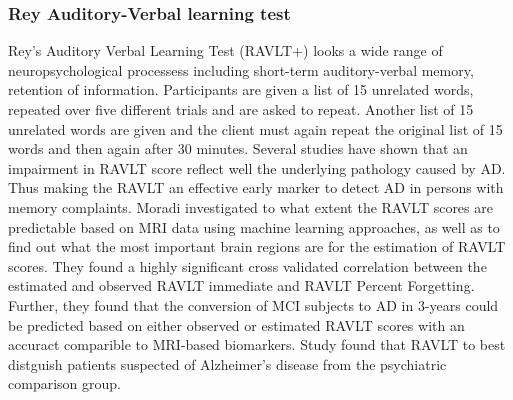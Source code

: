 \documentclass{article}
\begin{document}
\subsubsection{Rey Auditory-Verbal learning test}
Rey's Auditory Verbal Learning Test (RAVLT+) looks a wide range of neuropsychological processess including short-term auditory-verbal memory, retention of information. Participants are given a list of 15 unrelated words, repeated over five different trials and are asked to repeat. Another list of 15 unrelated words are given and the client must again repeat the original list of 15 words and then again after 30 minutes. 
Several studies have shown that an impairment in RAVLT score reflect well the underlying pathology caused by AD. Thus making the RAVLT an effective early marker to detect AD in persons with memory complaints. Moradi investigated to what extent the RAVLT scores are predictable based on MRI data using machine learning approaches, as well as to find out what the most important brain regions are for the estimation of RAVLT scores. They found a highly significant cross validated correlation between the estimated and observed RAVLT immediate and RAVLT Percent Forgetting. Further, they found that the conversion of MCI subjects to AD in 3-years could be predicted based on either observed or estimated RAVLT scores with an accuract comparible to MRI-based biomarkers.
Study found that RAVLT to best distguish patients suspected of Alzheimer's disease from the psychiatric comparison group.
\end{document}
